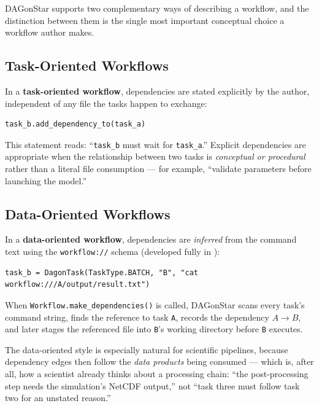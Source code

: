 DAGonStar supports two complementary ways of describing a workflow, and the
distinction between them is the single most important conceptual choice a
workflow author makes.

\subsection{Task-Oriented Workflows}

In a \textbf{task-oriented workflow}, dependencies are stated explicitly by
the author, independent of any file the tasks happen to exchange:

\begin{lstlisting}[caption={Explicit dependency declaration.}]
task_b.add_dependency_to(task_a)
\end{lstlisting}

This statement reads: ``\texttt{task\_b} must wait for \texttt{task\_a}.''
Explicit dependencies are appropriate when the relationship between two tasks
is \emph{conceptual or procedural} rather than a literal file consumption ---
for example, ``validate parameters before launching the model.''

\subsection{Data-Oriented Workflows}

In a \textbf{data-oriented workflow}, dependencies are \emph{inferred} from
the command text using the \texttt{workflow://} schema (developed fully in
):

\begin{lstlisting}[caption={Implicit, data-driven dependency.}]
task_b = DagonTask(TaskType.BATCH, "B", "cat workflow:///A/output/result.txt")
\end{lstlisting}

When \texttt{Workflow.make\_dependencies()} is called, DAGonStar scans every
task's command string, finds the reference to task \texttt{A}, records the
dependency $A \to B$, and later stages the referenced file into \texttt{B}'s
working directory before \texttt{B} executes.

\begin{practicebox}
The data-oriented style is especially natural for scientific pipelines,
because dependency edges then follow the \emph{data products} being consumed
--- which is, after all, how a scientist already thinks about a processing
chain: ``the post-processing step needs the simulation's NetCDF output,''
not ``task three must follow task two for an unstated reason.''
\end{practicebox}

